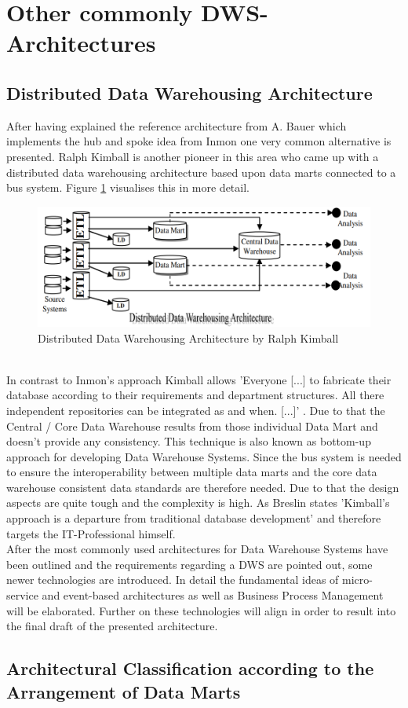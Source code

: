 \section{Other commonly DWS-Architectures}
\label{sec:otherArchitectures}

\subsection{Distributed Data Warehousing Architecture}
After having explained the reference architecture from A. Bauer which implements the hub and spoke idea from Inmon one very common alternative is presented. Ralph Kimball is another pioneer in this area who came up with a distributed data warehousing architecture based upon data marts connected to a bus system. \cite{surveyDWSArchs} Figure \ref{fig:distributedWarehouseArchitecture} visualises this in more detail.
\begin{figure}[htb]
    \centering
    \includegraphics[scale=0.5]{pictures/DistributedDataWarehouseArchitecture.PNG}
    \caption{Distributed Data Warehousing Architecture by Ralph Kimball \cite{surveyDWSArchs}}
    \label{fig:distributedWarehouseArchitecture}
\end{figure}
\\In contrast to Inmon's approach Kimball allows 'Everyone [...] to fabricate their database according to their requirements and department structures. All there independent repositories can be integrated as and when. [...]' \cite{surveyDWSArchs}. Due to that the Central / Core Data Warehouse results from those individual Data Mart and doesn't provide any consistency. This technique is also known as bottom-up approach for developing Data Warehouse Systems. Since the bus system is needed to ensure the interoperability between multiple data marts and the core data warehouse consistent data standards are therefore needed. Due to that the design aspects are quite tough and the complexity is high. \cite{KimbalVSInmon}\newline
As Breslin states 'Kimball's approach is a departure from traditional database development'\cite[p.~19]{KimbalVSInmon} and therefore targets the IT-Professional himself.\newline
\\
After the most commonly used architectures for Data Warehouse Systems have been outlined and the requirements regarding a DWS are pointed out, some newer technologies are introduced. In detail the fundamental ideas of micro-service and event-based architectures as well as Business Process Management will be elaborated. Further on these technologies will align in order to result into the final draft of the presented architecture.

\subsection{Architectural Classification according to the Arrangement of Data Marts}

